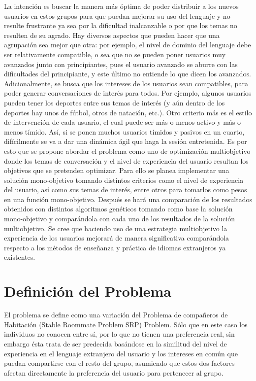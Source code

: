 La intención es buscar la manera más óptima de poder distribuir a los nuevos usuarios en estos grupos para que puedan mejorar su uso del lenguaje y no resulte frustrante ya sea por la dificultad inalcanzable o por que los temas no resulten de su agrado. Hay diversos aspectos que pueden hacer que una agrupación sea mejor que otra: por ejemplo, el nivel de dominio del lenguaje debe ser relativamente compatible, o sea que no se pueden poner usuarios muy avanzados junto con principiantes, pues el usuario avanzado se aburre con las dificultades del principiante, y este último no entiende lo que dicen los avanzados. Adicionalmente, se busca que los intereses de los usuarios sean compatibles, para poder generar conversaciones de interés para todos. Por ejemplo, algunos usuarios pueden tener los deportes entre sus temas de interés (y aún dentro de los deportes hay unos de fútbol, otros de natación, etc.). Otro criterio más es el estilo de intervención de cada usuario, el cual puede ser más o menos activo y más o menos tímido. Así, si se ponen muchos usuarios tímidos y pasivos en un cuarto, difícilmente se va a dar una dinámica ágil que haga la sesión entretenida. Es por esto que se propone abordar el problema como uno de optimización multiobjetivo donde los temas de conversación y el nivel de experiencia del usuario resultan los objetivos que se pretenden optimizar. Para ello se planea implementar una solución mono-objetivo tomando distintos criterios como el nivel de experiencia del usuario, así como sus temas de interés, entre otros para tomarlos como pesos en una función mono-objetivo. Después se hará una comparación de los resultados obtenidos con distintos algoritmos genéticos tomando como base la solución mono-objetivo y comparándola con cada uno de los resultados de la solución multiobjetivo. Se cree que haciendo uso de una estrategia multiobjetivo la experiencia de los usuarios mejorará de manera significativa comparándola respecto a los métodos de enseñanza y práctica de idiomas extranjeros ya existentes.\\

\section{Definición del Problema}

El problema se define como una variación del Problema de compañeros de Habitación (Stable Roommate Problem SRP) Problem\cite{greenwade93}. Sólo que en este caso los individuos no conocen entre sí, por lo que no tienen una preferencia real, sin embargo ésta trata de ser predecida basándose en la similitud del nivel de experiencia en el lenguaje extranjero del usuario y los intereses en común que puedan compartirse con el resto del grupo, asumiendo que estos dos factores afectan directamente la preferencia del usuario para pertenecer al grupo.\\ 

